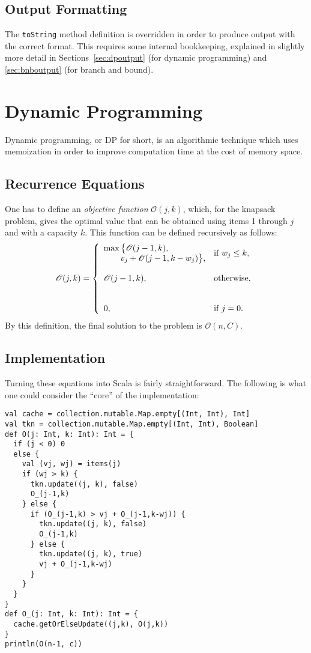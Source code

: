 \documentclass[journal]{IEEEtran}
\newcommand{\scala}[1]{\texttt{#1}}
\begin{document}
\subsection{Output Formatting}
The \scala{toString} method definition is overridden in order to produce output with the correct format.
This requires some internal bookkeeping, explained in slightly more detail in Sections~\ref{sec:dpoutput} (for dynamic programming) and \ref{sec:bnboutput} (for branch and bound).

\section{Dynamic Programming}
Dynamic programming, or DP for short, is an algorithmic technique which uses memoization in order to improve computation time at the cost of memory space.

\subsection{Recurrence Equations}
One has to define an \emph{objective function} \(\mathscr{O}(j, k)\), which, for the knapsack problem, gives the optimal value that can be obtained using items 1 through \(j\) and with a capacity \(k\).
This function can be defined recursively as follows:
\[
\mathscr{O}(j, k) = \left\{
\begin{array}{ll}
\max\big\{ \mathscr{O}(j-1, k), & \multirow{2}{*}{\(\textnormal{if } w_j \le k,\)}\\
\qquad v_j + \mathscr{O}(j-1, k-w_j) \big\}, & \\\\
\mathscr{O}(j-1, k), & \textnormal{otherwise,}\\\\\\
0, & \textnormal{if } j = 0.
\end{array}
\right.
\]
By this definition, the final solution to the problem is \(\mathscr{O}(n, C)\).
\subsection{Implementation}
Turning these equations into Scala is fairly straightforward.
The following is what one could consider the ``core'' of the implementation:
\begin{verbatim}
val cache = collection.mutable.Map.empty[(Int, Int), Int]
val tkn = collection.mutable.Map.empty[(Int, Int), Boolean]
def O(j: Int, k: Int): Int = {
  if (j < 0) 0
  else {
    val (vj, wj) = items(j)
    if (wj > k) {
      tkn.update((j, k), false)
      O_(j-1,k)
    } else {
      if (O_(j-1,k) > vj + O_(j-1,k-wj)) {
        tkn.update((j, k), false)
        O_(j-1,k)
      } else {
        tkn.update((j, k), true)
        vj + O_(j-1,k-wj)
      }
    }
  }
}
def O_(j: Int, k: Int): Int = {
  cache.getOrElseUpdate((j,k), O(j,k))
}
println(O(n-1, c))
\end{verbatim}
\end{document}
